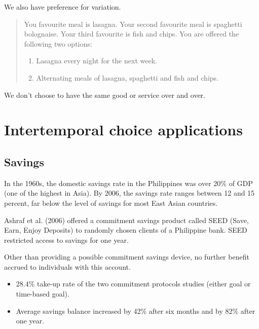 \documentclass[
  letterpaper,
  DIV=11,
  numbers=noendperiod]{scrreprt}
\providecommand{\tightlist}{%
  \setlength{\itemsep}{0pt}\setlength{\parskip}{0pt}}\usepackage{longtable,booktabs,array}
\begin{document}
We also have preference for variation.

\begin{quote}
You favourite meal is lasagna. Your second favourite meal is spaghetti
bolognaise. Your third favourite is fish and chips. You are offered the
following two options:

\begin{enumerate}
\def\labelenumi{\arabic{enumi}.}
\tightlist
\item
  Lasagna every night for the next week.
\item
  Alternating meals of lasagna, spaghetti and fish and chips.
\end{enumerate}
\end{quote}

We don't choose to have the same good or service over and over.

\hypertarget{intertemporal-choice-applications}{%
\chapter{Intertemporal choice
applications}\label{intertemporal-choice-applications}}

\hypertarget{savings}{%
\section{Savings}\label{savings}}

In the 1960s, the domestic savings rate in the Philippines was over 20\%
of GDP (one of the highest in Asia). By 2006, the savings rate ranges
between 12 and 15 percent, far below the level of savings for most East
Asian countries.

Ashraf et al. (2006) offered a commitment savings product called SEED
(Save, Earn, Enjoy Deposits) to randomly chosen clients of a Philippine
bank. SEED restricted access to savings for one year.

Other than providing a possible commitment savings device, no further
benefit accrued to individuals with this account.

\begin{itemize}
\tightlist
\item
  28.4\% take-up rate of the two commitment protocols studies (either
  goal or time-based goal).
\item
  Average savings balance increased by 42\% after six months and by 82\%
  after one year.
\end{itemize}
\end{document}
